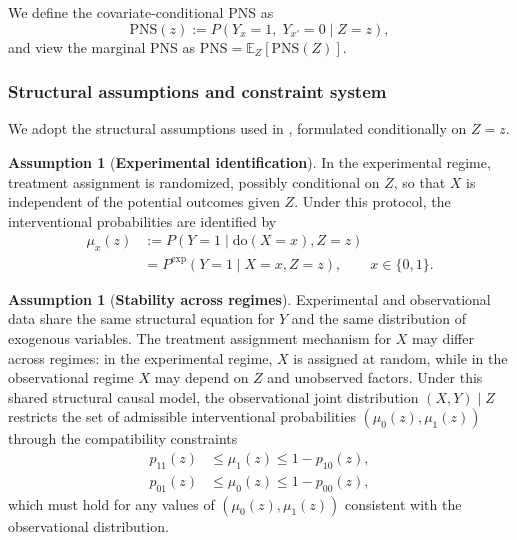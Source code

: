 \documentclass[accepted]{uai2026} %
\theoremstyle{plain}
\theoremstyle{definition}
\newtheorem{assumption}[theorem]{Assumption}
\theoremstyle{remark}
\begin{document}
We define the covariate-conditional PNS as
\begin{equation}
\mathrm{PNS}(z)
:= P\!\left(Y_x = 1,\; Y_{x'} = 0 \mid Z = z\right),
\label{eq:pns-z-def}
\end{equation}
and view the marginal PNS as 
$\mathrm{PNS} = \mathbb{E}_Z\!\left[\mathrm{PNS}(Z)\right]$.


\subsubsection{Structural assumptions and constraint system}
\label{subsec:pns-assumptions}

We adopt the structural assumptions used in
\cite{tian2000probabilities}, formulated conditionally on $Z = z$.


\begin{assumption}[{\bf Experimental identification}]
In the experimental regime, treatment assignment is randomized, possibly
conditional on $Z$, so that $X$ is independent of the potential outcomes
given $Z$.
Under this protocol, the interventional probabilities are identified by
\begin{align}
\nonumber \mu_x(z)
&:= P(Y = 1 \mid \mathrm{do}(X = x), Z = z)\\
&= P^{\mathrm{exp}}(Y = 1 \mid X = x, Z = z),
\qquad x \in \{0,1\}.
\end{align}
\end{assumption}

\begin{assumption}[{\bf Stability across regimes}]
Experimental and observational data share the same structural equation
for $Y$ and the same distribution of exogenous variables.
The treatment assignment mechanism for $X$ may differ across regimes:
in the experimental regime, $X$ is assigned at random, while in the
observational regime $X$ may depend on $Z$ and unobserved factors.
Under this shared structural causal model, the observational joint
distribution $(X,Y)\mid Z$ restricts the set of admissible interventional
probabilities $(\mu_0(z), \mu_1(z))$ through the compatibility constraints
\begin{equation}
\begin{aligned}
p_{11}(z) &\le \mu_1(z) \le 1 - p_{10}(z), \\
p_{01}(z) &\le \mu_0(z) \le 1 - p_{00}(z),
\end{aligned}
\label{eq:observational-constraints}
\end{equation}
which must hold for any values of $(\mu_0(z), \mu_1(z))$ consistent with
the observational distribution.
\end{assumption}
\end{document}
